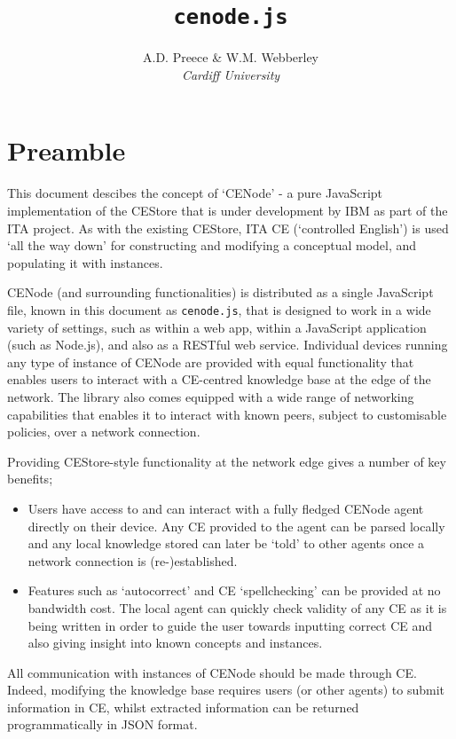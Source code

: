 \documentclass{article}
\title{\texttt{cenode.js}}
\author{A.D. Preece \& W.M. Webberley \\ \textit{Cardiff University}}
\date{}
\begin{document}
\maketitle

\section*{Preamble}
This document descibes the concept of `CENode' - a pure JavaScript implementation of the CEStore that is under development by IBM as part of the ITA project. As with the existing CEStore, ITA CE (`controlled English') is used `all the way down' for constructing and modifying a conceptual model, and populating it with instances. 

CENode (and surrounding functionalities) is distributed as a single JavaScript file, known in this document as \texttt{cenode.js}, that is designed to work in a wide variety of settings, such as within a web app, within a JavaScript application (such as Node.js), and also as a RESTful web service. Individual devices running any type of instance of CENode are provided with equal functionality that enables users to interact with a CE-centred knowledge base at the edge of the network. The library also comes equipped with a wide range of networking capabilities that enables it to interact with known peers, subject to customisable policies, over a network connection.

Providing CEStore-style functionality at the network edge gives a number of key benefits;
\begin{itemize}
    \item Users have access to and can interact with a fully fledged CENode agent directly on their device. Any CE provided to the agent can be parsed locally and any local knowledge stored can later be `told' to other agents once a network connection is (re-)established.
    \item Features such as `autocorrect' and CE `spellchecking' can be provided at no bandwidth cost. The local agent can quickly check validity of any CE as it is being written in order to guide the user towards inputting correct CE and also giving insight into known concepts and instances.
\end{itemize}

All communication with instances of CENode should be made through CE. Indeed, modifying the knowledge base requires users (or other agents) to submit information in CE, whilst extracted information can be returned programmatically in JSON format.
\end{document}
